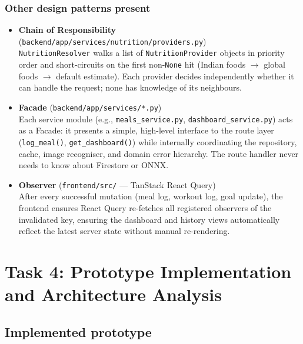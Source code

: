 \documentclass[11pt]{article}
\begin{document}

\subsubsection*{Other design patterns present}

\begin{itemize}[leftmargin=1.2em]

  \item \textbf{Chain of Responsibility}
        (\texttt{backend/app/services/nutrition/providers.py}) \\
        \texttt{NutritionResolver} walks a list of \texttt{NutritionProvider} objects in
        priority order and short-circuits on the first non-\texttt{None} hit
        (Indian foods $\to$ global foods $\to$ default estimate). Each provider decides
        independently whether it can handle the request; none has knowledge of its neighbours.

  \item \textbf{Facade}
        (\texttt{backend/app/services/*.py}) \\
        Each service module (e.g., \texttt{meals\_service.py}, \texttt{dashboard\_service.py})
        acts as a Facade: it presents a simple, high-level interface to the route layer
        (\texttt{log\_meal()}, \texttt{get\_dashboard()}) while internally coordinating the
        repository, cache, image recogniser, and domain error hierarchy. The route handler
        never needs to know about Firestore or ONNX.

  \item \textbf{Observer}
        (\texttt{frontend/src/} --- TanStack React Query) \\
        After every successful mutation (meal log, workout log, goal update), the frontend ensures React Query re-fetches all registered observers of the invalidated key, ensuring the dashboard and history views automatically reflect the latest server state without manual re-rendering.

\end{itemize}

\newpage
\section{Task 4: Prototype Implementation and Architecture Analysis}

\subsection{Implemented prototype}
\end{document}
